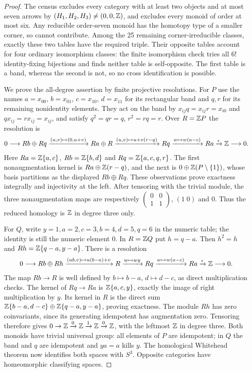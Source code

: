\begin{proof}
The census excludes every category with at least two objects and at most
seven arrows by $(H_1,H_2,H_3)\ne(0,0,\mathbb Z)$, and excludes every monoid
of order at most six. Any reducible order-seven monoid has the homotopy
type of a smaller corner, so cannot contribute. Among the 25 remaining
corner-irreducible classes, exactly these two tables have the required
triple. Their opposite tables account for four ordinary isomorphism classes:
the finite isomorphism check tries all $6!$ identity-fixing bijections and
finds neither table is self-opposite. The first table is a band, whereas
the second is not, so no cross identification is possible.

We prove the all-degree assertion by finite projective resolutions.
For $P$ use the names $a=x_{00}$, $b=x_{01}$, $c=x_{10}$,
$d=x_{11}$ for its rectangular band and $q,r$ for its remaining
nonidentity elements. They act on the band by
$x_{ij}q=x_{ij}r=x_{i0}$ and $qx_{ij}=rx_{ij}=x_{ij}$,
and satisfy $q^2=qr=q$, $r^2=rq=r$. Over $R=\mathbb Z P$ the resolution is
\[
 0\longrightarrow Rb\oplus Rq
 \xrightarrow{(u,v)\mapsto(0,u+v)}Ra\oplus R
 \xrightarrow{(u,v)\mapsto u+v(r-q)}Rq
 \xrightarrow{w\mapsto w(a-c)}Ra
 \xrightarrow{\epsilon}\mathbb Z\longrightarrow0.
\]
Here $Ra=\mathbb Z\{a,c\}$, $Rb=\mathbb Z\{b,d\}$ and
$Rq=\mathbb Z\{a,c,q,r\}$. The first nonaugmentation kernel is
$Ra\oplus\mathbb Z(r-q)$, and the next is $0\oplus\mathbb Z(P\setminus\{1\})$,
whose basis partitions as the displayed $Rb\oplus Rq$.
These observations prove exactness integrally and injectivity at the left.
After tensoring with the trivial module, the three nonaugmentation
maps are respectively
$\left(\begin{smallmatrix}0&0\\1&1\end{smallmatrix}\right)$,
$(1\;0)$ and $0$. Thus the reduced homology is $\mathbb Z$ in degree three only.

For $Q$, write $y=1,a=2,c=3,b=4,d=5,q=6$ in the numeric table;
the identity is still the numeric element $0$. In $R=\mathbb Z Q$ put
$h=q-a$. Then $h^2=h$ and $Rh=\mathbb Z\{q-a,y-a\}$.
There is a resolution
\[
 0\longrightarrow Rb\oplus Rh
 \xrightarrow{(ub,v)\mapsto u(b-a)+v}R
 \xrightarrow{w\mapsto wy}Rq
 \xrightarrow{w\mapsto w(a-c)}Ra
 \xrightarrow{\epsilon}\mathbb Z\longrightarrow0.
\]
The map $Rb\to R$ is well defined by $b\mapsto b-a$,
$d\mapsto d-c$, as direct multiplication checks. The kernel of
$Rq\to Ra$ is $\mathbb Z\{a,c,y\}$, exactly the image of right
multiplication by $y$. Its kernel in $R$ is the direct sum
$\mathbb Z\{b-a,d-c\}\oplus\mathbb Z\{q-a,y-a\}$, proving exactness.
The module $Rh$ has zero coinvariants, since its generating idempotent
has augmentation zero. Tensoring therefore gives
$0\to\mathbb Z\xrightarrow0\mathbb Z\xrightarrow1\mathbb Z\xrightarrow0\mathbb Z$,
with the leftmost $\mathbb Z$ in degree three. Both monoids have trivial
universal group: all elements of $P$ are idempotent; in $Q$ the band
and $q$ are idempotent and $ya=a$ kills $y$. The homological Whitehead
theorem now identifies both spaces with $S^3$. Opposite categories have
homeomorphic classifying spaces.
\end{proof}

